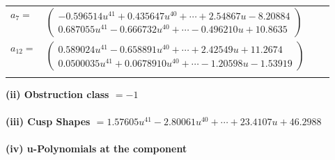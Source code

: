 \documentclass[1p]{elsarticle_modified}
\theoremstyle{definition}
\begin{document}
\begin{tabular}{m{7pt} m{180pt} m{7pt} m{180pt} }
\flushright $a_{7}=$&$\begin{pmatrix}-0.596514 u^{41}+0.435647 u^{40}+\cdots+2.54867 u-8.20884\\0.687055 u^{41}-0.666732 u^{40}+\cdots-0.496210 u+10.8635\end{pmatrix}$ \\
\flushright $a_{12}=$&$\begin{pmatrix}0.589024 u^{41}-0.658891 u^{40}+\cdots+2.42549 u+11.2674\\0.0500035 u^{41}+0.0678910 u^{40}+\cdots-1.20598 u-1.53919\end{pmatrix}$\\&\end{tabular}
\flushleft \textbf{(ii) Obstruction class $= -1$}\\~\\
\flushleft \textbf{(iii) Cusp Shapes $= 1.57605 u^{41}-2.80061 u^{40}+\cdots+23.4107 u+46.2988$}\\~\\
\newpage\renewcommand{\arraystretch}{1}
\flushleft \textbf{(iv) u-Polynomials at the component}\newline \\
\end{document}
